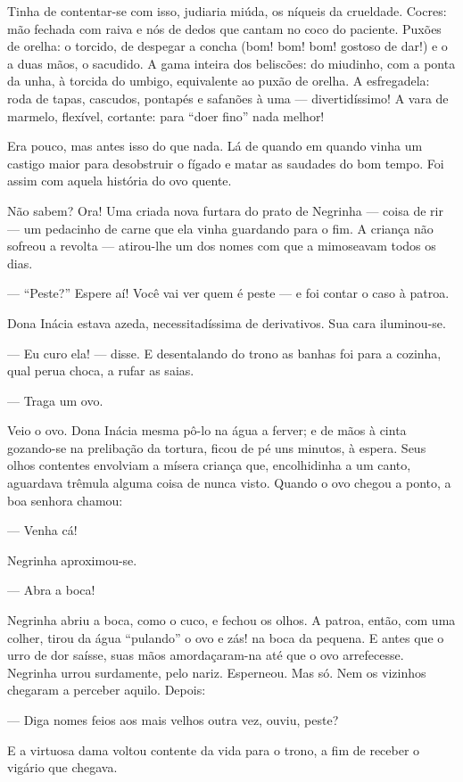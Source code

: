 Tinha de contentar-se com isso, judiaria miúda, os níqueis da crueldade.
Cocres: mão fechada com raiva e nós de dedos que cantam no coco do
paciente. Puxões de orelha: o torcido, de despegar a concha (bom! bom!
bom! gostoso de dar!) e o a duas mãos, o sacudido. A gama inteira dos
beliscões: do miudinho, com a ponta da unha, à torcida do umbigo,
equivalente ao puxão de orelha. A esfregadela: roda de tapas, cascudos,
pontapés e safanões à uma --- divertidíssimo! A vara de marmelo,
flexível, cortante: para ``doer fino'' nada melhor!

Era pouco, mas antes isso do que nada. Lá de quando em quando vinha um
castigo maior para desobstruir o fígado e matar as saudades do bom
tempo. Foi assim com aquela história do ovo quente.

Não sabem? Ora! Uma criada nova furtara do prato de Negrinha --- coisa
de rir --- um pedacinho de carne que ela vinha guardando para o fim. A
criança não sofreou a revolta --- atirou-lhe um dos nomes com que a
mimoseavam todos os dias.

--- ``Peste?'' Espere aí! Você vai ver quem é peste --- e foi contar o
caso à patroa.

Dona Inácia estava azeda, necessitadíssima de derivativos. Sua cara
iluminou-se.

--- Eu curo ela! --- disse. E desentalando do trono as banhas foi para a
cozinha, qual perua choca, a rufar as saias.

--- Traga um ovo.

Veio o ovo. Dona Inácia mesma pô-lo na água a ferver; e de mãos à cinta
gozando-se na prelibação da tortura, ficou de pé uns minutos, à espera.
Seus olhos contentes envolviam a mísera criança que, encolhidinha a um
canto, aguardava trêmula alguma coisa de nunca visto. Quando o ovo
chegou a ponto, a boa senhora chamou:

--- Venha cá!

Negrinha aproximou-se.

--- Abra a boca!

Negrinha abriu a boca, como o cuco, e fechou os olhos. A patroa, então,
com uma colher, tirou da água ``pulando'' o ovo e zás! na boca da
pequena. E antes que o urro de dor saísse, suas mãos amordaçaram-na até
que o ovo arrefecesse. Negrinha urrou surdamente, pelo nariz. Esperneou.
Mas só. Nem os vizinhos chegaram a perceber aquilo. Depois:

--- Diga nomes feios aos mais velhos outra vez, ouviu, peste?

E a virtuosa dama voltou contente da vida para o trono, a fim de receber
o vigário que chegava.


